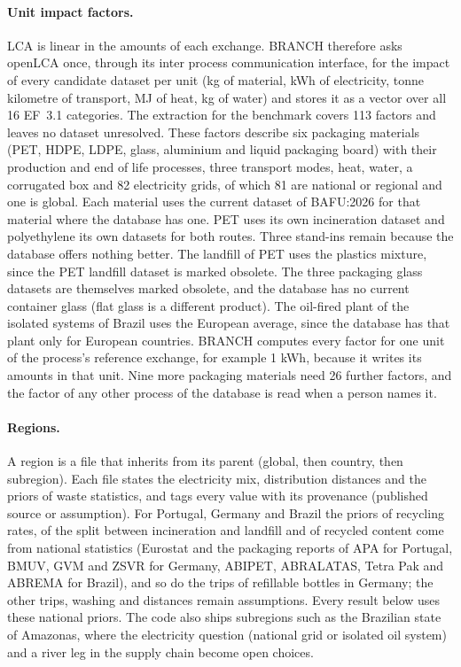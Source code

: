 \documentclass{article}
\begin{document}
\paragraph{Unit impact factors.}
LCA is linear in the amounts of each exchange. BRANCH therefore asks openLCA once, through its inter
process communication interface, for the impact of every candidate dataset per unit (kg of material, kWh
of electricity, tonne kilometre of transport, MJ of heat, kg of water) and stores it as a vector over all
16 EF~3.1 categories. The extraction for the benchmark covers 113 factors and leaves no dataset unresolved. These factors
describe six packaging materials (PET, HDPE, LDPE, glass, aluminium and liquid packaging board) with their
production and end of life processes, three transport modes, heat, water, a corrugated box and 82 electricity
grids, of which 81 are national or regional
and one is global. Each material uses the current dataset of BAFU:2026 for that material where the database has one. PET uses its own incineration dataset and polyethylene its own datasets for both routes. Three stand-ins remain because the database offers nothing better. The landfill of PET uses the plastics mixture, since the PET landfill dataset is marked obsolete. The three packaging glass datasets are themselves marked obsolete, and the database has no current container glass (flat glass is a different product). The oil-fired plant of the isolated systems of Brazil uses the European average, since the database has that plant only for European countries. BRANCH computes every factor for one unit of the process's reference
exchange, for example 1 kWh, because it writes its amounts in that unit. Nine more packaging materials need
26 further factors, and the factor of any other process of the database is read when a person names it.

\paragraph{Regions.}
A region is a file that inherits from its parent (global, then country, then subregion). Each file states
the electricity mix, distribution distances and the priors of waste statistics, and tags every value with
its provenance (published source or assumption). For Portugal, Germany and Brazil the priors of recycling
rates, of the split between incineration and landfill and of recycled content come from national
statistics (Eurostat and the packaging reports of APA for Portugal, BMUV, GVM and ZSVR for Germany, ABIPET,
ABRALATAS, Tetra Pak and ABREMA for Brazil), and so do the trips of refillable bottles in Germany; the other trips,
washing and distances remain assumptions. Every result below uses these national priors. The code also ships subregions such as the Brazilian
state of Amazonas, where the electricity question (national grid or isolated oil system) and a river leg
in the supply chain become open choices.
\end{document}
